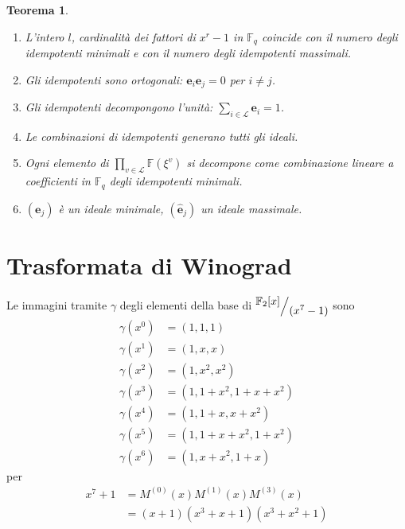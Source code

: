 \documentclass[mathserif]{beamer}
\def\quotient#1#2{%
   \raise1ex\hbox{$#1$}\Big/\lower1ex\hbox{$#2$}%
}
\newtheorem{teorema}{Teorema}
\begin{document}
\begin{frame}
\begin{teorema}
   \begin{enumerate}
      \item L'intero $l$, cardinalità dei fattori di $x^r-1$ in $\mathbb{F}_{q}$ coincide con il numero degli idempotenti minimali e con il numero degli idempotenti massimali.
      \item Gli idempotenti sono ortogonali: $\mathbf{e}_{i}\mathbf{e}_{j}  = \mathfrak{0}$ per $i \neq j$.
      \item Gli idempotenti decompongono l'unità: $\sum_{i \in \mathscr{L}}\mathbf{e}_{i}  = \mathfrak{1}$.
      \item Le combinazioni di idempotenti generano tutti gli ideali.
      \item Ogni elemento di $ \prod_{v\in \mathscr{L}} \mathbb{F}(\xi^{v})$ si decompone come combinazione lineare a coefficienti in $\mathbb{F}_{q}$ degli idempotenti minimali.
      \item $(\mathbf{e}_{j})$ è un ideale minimale, $(\mathbf{\hat{e}}_{j})$ un ideale massimale.
   \end{enumerate}
\end{teorema}
\end{frame}


\section{Trasformata di Winograd}

\thispagestyle{empty}
\begin{frame}
   \vspace{-1.2cm}
    Le immagini tramite $\gamma$ degli elementi della base di $ \quotient{\mathbb{F}_{2} \lbrack x \rbrack  }{ (x^{7} - 1)}$ sono
    \begin{align*}   
      \gamma(x^0) &= (1,1,1)  \\
      \gamma(x^1) &= (1,x,x) \\
      \gamma(x^2) &= (1,x^2,x^2)  \\
      \gamma(x^3) &= (1,1+x^2,1+x+x^2)  \\
      \gamma(x^4) &= (1,1+x,x+x^2)  \\
      \gamma(x^5) &= (1,1+x+x^2,1+x^2)  \\
      \gamma(x^6) &= (1,x+x^2,1+x) 
    \end{align*}
    per 
    \begin{align*}
      x^{7} + 1 &= M^{(0)}(x) M^{(1)}(x) M^{(3)}(x) \\
		&= (x+1)(x^3 + x + 1)(x^3 + x^2 + 1) 
    \end{align*}
\end{frame}
\end{document}
